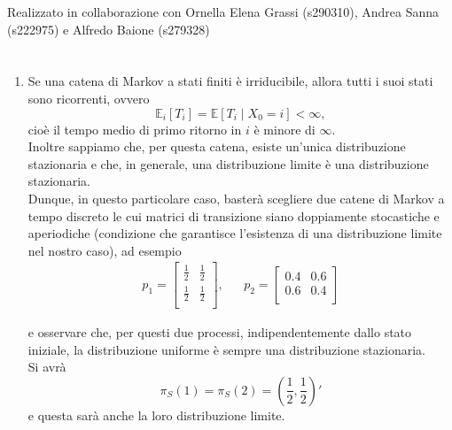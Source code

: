 \documentclass[12pt]{homework}
\begin{document}
\maketitle
\begin{center}
Realizzato in collaborazione con Ornella Elena Grassi (s290310), Andrea Sanna (s222975) e Alfredo Baione (s279328)
\end{center}
\section{}
\begin{enumerate}


  
    \item
    Se una catena di Markov a stati finiti è irriducibile, allora tutti i suoi stati sono ricorrenti, ovvero
    \begin{equation*}
    \mathbb{E}_{i}[T_{i}]=\mathbb{E}[T_{i}\mid X_{0}=i]<\infty,
    \end{equation*}
    cioè il tempo medio di primo ritorno in $i$ è minore di $\infty$.\\
    Inoltre sappiamo che, per questa catena, esiste un'unica distribuzione stazionaria e che, in generale, una distribuzione limite è una distribuzione stazionaria.\\
    Dunque, in questo particolare caso, basterà scegliere due catene di Markov a tempo discreto le cui matrici di transizione siano doppiamente stocastiche e aperiodiche (condizione che garantisce l'esistenza di una distribuzione limite nel nostro caso), ad esempio
    \begin{align*}
    p_{1}=\begin{bmatrix}
        \frac{1}{2} & \frac{1}{2}\\
        \frac{1}{2} & \frac{1}{2} \\ 
      \end{bmatrix}, &&  
      p_{2}=\begin{bmatrix}
         0.4 & 0.6\\
        0.6 & 0.4 \\ 
      \end{bmatrix}
    \end{align*}
    
    e osservare che, per questi due processi, indipendentemente dallo stato iniziale, la distribuzione uniforme è sempre una distribuzione stazionaria. \\
    Si avrà
    \begin{equation*}
    \pi_{S}\left(1\right)=\pi_{S}\left(2\right)= \left(\frac{1}{2},\frac{1}{2}\right)'
    \end{equation*}
     e questa sarà anche la loro distribuzione limite.
     \newpage
     

\end{enumerate}
\end{document}

